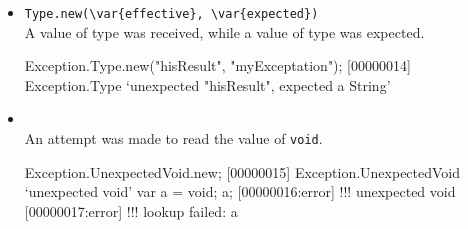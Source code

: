 \begin{itemize}
\begin{urbiscript}
try
{
  eval("1 / / 0");
}
catch (var e)
{
  assert
  {
    e.isA(Exception.Syntax);
    e.loc.asString == "1.5";
    e.input == "1 / / 0";
    e.message == "unexpected /";
  }
};
\end{urbiscript}


\item \lstinline|Type.new(\var{effective}, \var{expected})|\\
  A value of type  was received, while a value of type
   was expected.
\begin{urbiscript}
Exception.Type.new("hisResult", "myExceptation");
[00000014] Exception.Type `unexpected "hisResult", expected a String'
\end{urbiscript}

\item {}\\
  An attempt was made to read the value of \lstinline|void|.
\begin{urbiscript}
Exception.UnexpectedVoid.new;
[00000015] Exception.UnexpectedVoid `unexpected void'
var a = void;
a;
[00000016:error] !!! unexpected void
[00000017:error] !!! lookup failed: a
\end{urbiscript}

\end{itemize}


